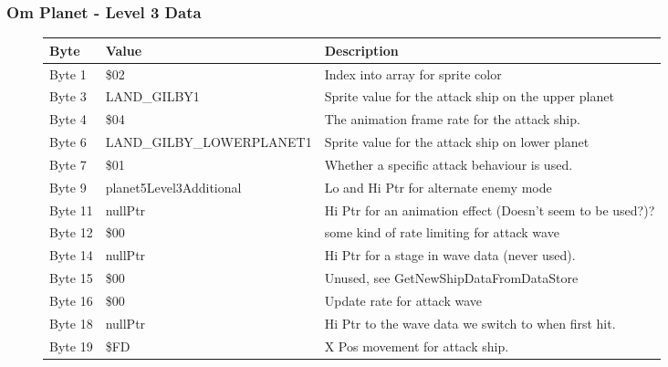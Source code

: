 \clearpage
\subsubsection{Om Planet - Level 3 Data}

\begin{figure}[H]
  {
  \setlength{\tabcolsep}{3.0pt}
  \setlength\cmidrulewidth{\heavyrulewidth} %
  \begin{adjustbox}{width=12cm}

\begin{tabular}{lll}
\toprule
 Byte    & Value                     & Description                                                        \\
\midrule
 Byte 1  & \$02                       & Index into array for sprite color                                  \\
 Byte 3  & LAND\_GILBY1               & Sprite value for the attack ship on the upper planet               \\
 Byte 4  & \$04                       & The animation frame rate for the attack ship.                      \\
 Byte 6  & LAND\_GILBY\_LOWERPLANET1   & Sprite value for the attack ship on lower planet                   \\
 Byte 7  & \$01                       & Whether a specific attack behaviour is used.                       \\
 Byte 9  & planet5Level3Additional   & Lo and Hi Ptr for alternate enemy mode                             \\
 Byte 11 & nullPtr                   & Hi Ptr for an animation effect (Doesn't seem to be used?)?         \\
 Byte 12 & \$00                       & some kind of rate limiting for attack wave                         \\
 Byte 14 & nullPtr                   & Hi Ptr for a stage in wave data (never used).                      \\
 Byte 15 & \$00                       & Unused, see GetNewShipDataFromDataStore                            \\
 Byte 16 & \$00                       & Update rate for attack wave                                        \\
 Byte 18 & nullPtr                   & Hi Ptr to the wave data we switch to when first hit.               \\
 Byte 19 & \$FD                       & X Pos movement for attack ship.                                    \\

\end{tabular}
\end{adjustbox}}
\end{figure}
